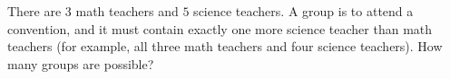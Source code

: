 There are $3$ math teachers and $5$ science teachers. A group is to attend a convention, and it must contain exactly one more science teacher than math teachers (for example, all three math teachers and four science teachers). How many groups are possible?
